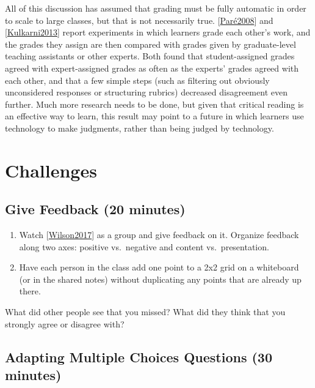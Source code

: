 \documentclass[10pt,statementpaper]{memoir}
\begin{document}
All of this discussion has assumed that grading must be fully automatic
in order to scale to large classes, but that is not necessarily true.
{[}\href{biblio.html\#pare-joordens-peer}{Paré2008}{]} and
{[}\href{biblio.html\#kulkarni-peer-grading}{Kulkarni2013}{]} report
experiments in which learners grade each other's work, and the grades
they assign are then compared with grades given by graduate-level
teaching assistants or other experts. Both found that student-assigned
grades agreed with expert-assigned grades as often as the experts'
grades agreed with each other, and that a few simple steps (such as
filtering out obviously unconsidered responses or structuring rubrics)
decreased disagreement even further. Much more research needs to be
done, but given that critical reading is an effective way to learn, this
result may point to a future in which learners use technology to make
judgments, rather than being judged by technology.

\section{Challenges}\label{challenges-9}

\subsection*{Give Feedback (20
minutes)}\label{give-feedback-20-minutes-1}

\begin{enumerate}
\def\labelenumi{\arabic{enumi}.}
\item
  Watch
  {[}\href{biblio.html\#wilson-bad-teaching-recorded}{Wilson2017}{]} as
  a group and give feedback on it. Organize feedback along two axes:
  positive vs.~negative and content vs.~presentation.
\item
  Have each person in the class add one point to a 2x2 grid on a
  whiteboard (or in the shared notes) without duplicating any points
  that are already up there.
\end{enumerate}

What did other people see that you missed? What did they think that you
strongly agree or disagree with?

\subsection*{Adapting Multiple Choices Questions (30
minutes)}\label{adapting-multiple-choices-questions-30-minutes}
\end{document}

